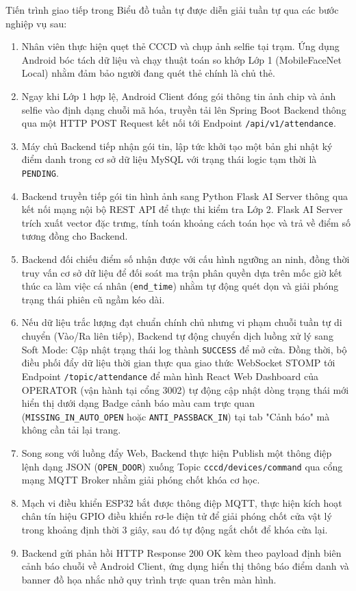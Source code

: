﻿\documentclass[../DoAn.tex]{subfiles}
\begin{document}
Tiến trình giao tiếp trong Biểu đồ tuần tự được diễn giải tuần tự qua các bước nghiệp vụ sau:
\begin{enumerate}
    \item Nhân viên thực hiện quẹt thẻ CCCD và chụp ảnh selfie tại trạm. Ứng dụng Android bóc tách dữ liệu và chạy thuật toán so khớp Lớp 1 (MobileFaceNet Local) nhằm đảm bảo người đang quét thẻ chính là chủ thẻ.
    \item Ngay khi Lớp 1 hợp lệ, Android Client đóng gói thông tin ảnh chip và ảnh selfie vào định dạng chuỗi mã hóa, truyền tải lên Spring Boot Backend thông qua một HTTP POST Request kết nối tới Endpoint \texttt{/api/v1/attendance}.
    \item Máy chủ Backend tiếp nhận gói tin, lập tức khởi tạo một bản ghi nhật ký điểm danh trong cơ sở dữ liệu MySQL với trạng thái logic tạm thời là \texttt{PENDING}.
    \item Backend truyền tiếp gói tin hình ảnh sang Python Flask AI Server thông qua kết nối mạng nội bộ REST API để thực thi kiểm tra Lớp 2. Flask AI Server trích xuất vector đặc trưng, tính toán khoảng cách toán học và trả về điểm số tương đồng cho Backend.
    \item Backend đối chiếu điểm số nhận được với cấu hình ngưỡng an ninh, đồng thời truy vấn cơ sở dữ liệu để đối soát ma trận phân quyền  dựa trên mốc giờ kết thúc ca làm việc cá nhân (\texttt{end\_time}) nhằm tự động quét dọn và giải phóng trạng thái phiên cũ ngầm kéo dài.
    \item Nếu dữ liệu trắc lượng đạt chuẩn chính chủ nhưng vi phạm chuỗi tuần tự di chuyển (Vào/Ra liên tiếp), Backend tự động chuyển dịch luồng xử lý sang Soft Mode: Cập nhật trạng thái log thành \texttt{SUCCESS} để mở cửa. Đồng thời, bộ điều phối đẩy dữ liệu thời gian thực qua giao thức WebSocket STOMP tới Endpoint \texttt{/topic/attendance} để màn hình React Web Dashboard của OPERATOR (vận hành tại cổng 3002) tự động cập nhật dòng trạng thái mới hiển thị dưới dạng Badge cảnh báo màu cam trực quan (\texttt{MISSING\_IN\_AUTO\_OPEN} hoặc \texttt{ANTI\_PASSBACK\_IN}) tại tab "Cảnh báo" mà không cần tải lại trang.
    \item Song song với luồng đẩy Web, Backend thực hiện Publish một thông điệp lệnh dạng JSON (\texttt{OPEN\_DOOR}) xuống Topic \texttt{cccd/devices/command} qua cổng mạng MQTT Broker nhằm giải phóng chốt khóa cơ học.
    \item Mạch vi điều khiển ESP32 bắt được thông điệp MQTT, thực hiện kích hoạt chân tín hiệu GPIO điều khiển rơ-le điện tử để giải phóng chốt cửa vật lý trong khoảng định thời 3 giây, sau đó tự động ngắt chốt để khóa cửa lại.
    \item Backend gửi phản hồi HTTP Response 200 OK kèm theo payload định biên cảnh báo chuỗi về Android Client, ứng dụng hiển thị thông báo điểm danh và banner đồ họa nhắc nhở quy trình trực quan trên màn hình.
\end{enumerate}
\end{document}
